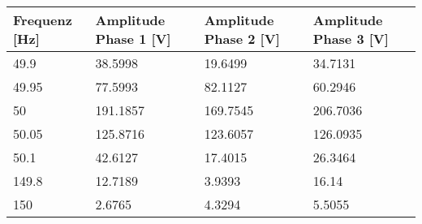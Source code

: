 \newpage
\begin{table}[ht!]
	\centering
	\begin{tabular}{|l|l|l|l|}
		\hline
		Frequenz {[}Hz{]} & Amplitude Phase 1 {[}V{]}                                                           & Amplitude Phase 2 {[}V{]}                                                           & Amplitude Phase 3 {[}V{]}                                                           \\ \hline
		49.9              & 38.5998                                                                             & 19.6499                                                                             & 34.7131                                                                             \\ \hline
		49.95             & 77.5993                                                                             & 82.1127                                                                             & 60.2946                                                                             \\ \hline
		50                & 191.1857                                                                            & 169.7545                                                                            & 206.7036                                                                            \\ \hline
		50.05             & 125.8716                                                                            & 123.6057                                                                            & 126.0935                                                                            \\ \hline
		50.1              & 42.6127                                                                             & 17.4015                                                                             & 26.3464                                                                             \\ \hline
		149.8             & 12.7189                                                                             & 3.9393                                                                              & 16.14                                                                               \\ \hline
		150               & 2.6765                                                                              & 4.3294                                                                              & 5.5055                                                                              \\ \hline

\end{tabular}
\end{table}

